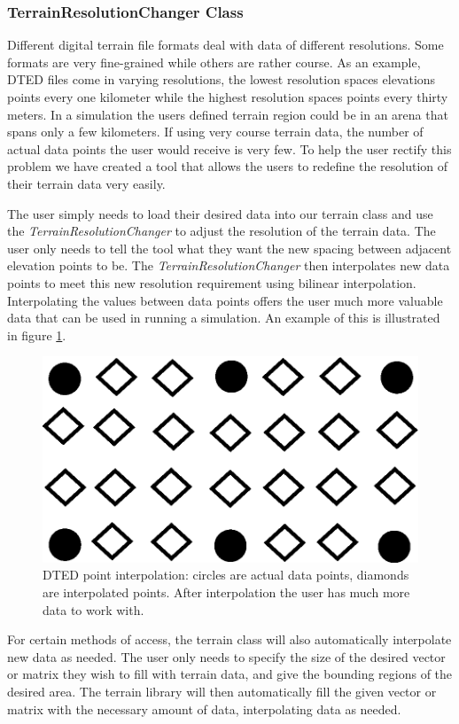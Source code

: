 \subsubsection{TerrainResolutionChanger Class}
Different digital terrain file formats deal with data of different resolutions.  Some formats are very fine-grained while others are rather course.  As an example, DTED files come in varying resolutions, the lowest resolution spaces elevations points every one kilometer while the highest resolution spaces points every thirty meters.  In a simulation the users defined terrain region could be in an arena that spans only a few kilometers.  If using very course terrain data, the number of actual data points the user would receive is very few.  To help the user rectify this problem we have created a tool that allows the users to redefine the resolution of their terrain data very easily.

The user simply needs to load their desired data into our terrain class and use the \textit{TerrainResolutionChanger} to adjust the resolution of the terrain data.  The user only needs to tell the tool what they want the new spacing between adjacent elevation points to be.  The \textit{TerrainResolutionChanger} then interpolates new data points to meet this new resolution requirement using bilinear interpolation.  Interpolating the values between data points offers the user much more valuable data that can be used in running a simulation.  An example of this is illustrated in figure \ref{fig:dted_interpolation}.

\begin{figure}[ht]
\centering
  \includegraphics[width = 0.5\linewidth]{images/network_vis/dted_interpolation.eps}
  \caption{DTED point interpolation: circles are actual data points, diamonds are interpolated points.  After interpolation the user has much more data to work with.}
\label{fig:dted_interpolation}
\end{figure}

For certain methods of access, the terrain class will also automatically interpolate new data as needed.  The user only needs to specify the size of the desired vector or matrix they wish to fill with terrain data, and give the bounding regions of the desired area.  The terrain library will then automatically fill the given vector or matrix with the necessary amount of data, interpolating data as needed.

